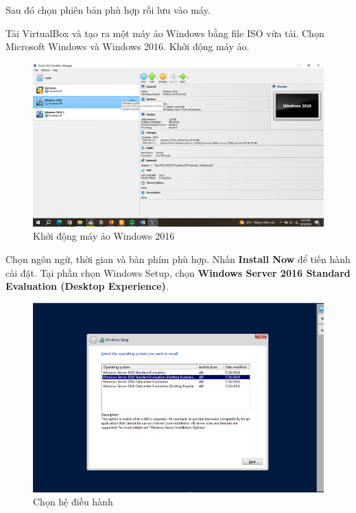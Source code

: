 \noindent Sau đó chọn phiên bản phù hợp rồi lưu vào máy.

\vskip 0.5cm
 Tải VirtualBox và tạo ra một máy ảo Windows bằng file ISO vừa tải. Chọn Microsoft Windows và Windows 2016. Khởi động máy ảo.

\begin{figure}[!htb]
    \centering
    \includegraphics[width=1\linewidth]{figure//chapter4//lab4_1/start_vm.png}
    \caption{Khởi động máy ảo Windows 2016}
    \label{fig:enter-label}
\end{figure}

\vskip 0.5cm
 Chọn ngôn ngữ, thời gian và bàn phím phù hợp. Nhấn {\bf Install Now} để tiến hành cài đặt. Tại phần chọn Windows Setup, chọn {\bf Windows Server 2016 Standard Evaluation (Desktop Experience)}.

\begin{figure}[!htb]
    \centering
    \includegraphics[width=0.8\linewidth]{figure//chapter4//lab4_1/select_os.png}
    \caption{Chọn hệ điều hành}
    \label{fig:enter-label}
\end{figure}

\vskip 0.5cm


